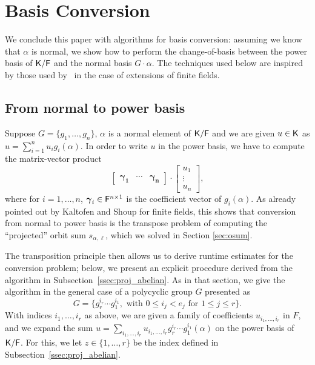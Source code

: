 \section{Basis Conversion}\label{sec:conversion}

We conclude this paper with algorithms for basis conversion: assuming
we know that $\alpha$ is normal, we show how to perform the
change-of-basis between the power basis of ${\mathsf{K}}/{\mathsf{F}}$ and the normal
basis $G\cdot \alpha$. The techniques used below are inspired by 
those used by~\cite[Section~4]{KalSho98} in the case of extensions
of finite fields.

\subsection{From normal to power basis} Suppose $G = \lbrace g_1, \ldots, g_n
\rbrace$, $\alpha$ is a normal element of ${\mathsf{K}}/{\mathsf{F}}$ and we are given $u\in {\mathsf{K}}$ 
as $u=\sum_{i=1}^n u_i g_i(\alpha)$. In order to write
$u $ in the power basis, we have to compute the matrix-vector 
product
\begin{equation}\label{eq:norm2pwrmat}
\left[\begin{array}{ccc}
\boldsymbol{ \gamma_1} & \cdots & \boldsymbol{ \gamma_n }
\end{array}\right]\cdot 
\begin{bmatrix}
u_1 \\ \vdots \\ u_n
\end{bmatrix},
\end{equation}
where for $i=1,\dots,n$, $\boldsymbol \gamma_i \in {\mathsf{F}}^{n\times 1}$ is
the coefficient vector of $g_i(\alpha)$. As already pointed out by
Kaltofen and Shoup for finite fields, this shows that conversion from normal to power
basis is the transpose problem of computing the ``projected'' orbit
sum $s_{\alpha,\ell}$, which we solved in Section \ref{sec:osum}. 

The transposition principle then allows us to derive runtime estimates
for the conversion problem; below, we present an explicit procedure
derived from the algorithm in Subsection~\ref{ssec:proj_abelian}.  As
in that section, we give the algorithm in the general case of a
polycyclic group $G$ presented as
\[
G =\{ g_r^{i_r} \cdots g_1^{i_1}, \text{~with~}  0 \leq i_j < e_j \text{~for~} 1 \leq j \leq r\}.
\]
With indices $i_1,\dots,i_r$ as above, we are given a family of 
coefficients $u_{i_1,\dots,i_r}$ in $F$, and we expand the sum
$u=\sum_{i_1,\dots,i_r} u_{i_1,\dots,i_r} g_r^{i_r} \cdots g_1^{i_1}(\alpha)$
on the power basis of ${\mathsf{K}}/{\mathsf{F}}$. For this, we let $z \in\{1,\dots,r\}$ be the index
defined in Subsection~\ref{ssec:proj_abelian}.


